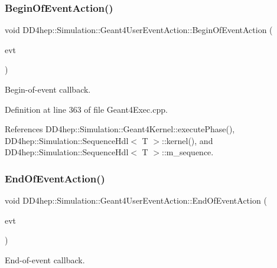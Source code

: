 \subsubsection{\texorpdfstring{Begin\+Of\+Event\+Action()}{BeginOfEventAction()}}
{\footnotesize\ttfamily void D\+D4hep\+::\+Simulation\+::\+Geant4\+User\+Event\+Action\+::\+Begin\+Of\+Event\+Action (\begin{DoxyParamCaption}\item[{const G4\+Event $\ast$}]{evt }\end{DoxyParamCaption})\hspace{0.3cm}{\ttfamily [virtual]}}



Begin-\/of-\/event callback. 



Definition at line 363 of file Geant4\+Exec.\+cpp.



References D\+D4hep\+::\+Simulation\+::\+Geant4\+Kernel\+::execute\+Phase(), D\+D4hep\+::\+Simulation\+::\+Sequence\+Hdl$<$ T $>$\+::kernel(), and D\+D4hep\+::\+Simulation\+::\+Sequence\+Hdl$<$ T $>$\+::m\+\_\+sequence.

\hypertarget{class_d_d4hep_1_1_simulation_1_1_geant4_user_event_action_a5fe13da05fc37d5d69ed814b061cada0}{}\label{class_d_d4hep_1_1_simulation_1_1_geant4_user_event_action_a5fe13da05fc37d5d69ed814b061cada0} 
\subsubsection{\texorpdfstring{End\+Of\+Event\+Action()}{EndOfEventAction()}}
{\footnotesize\ttfamily void D\+D4hep\+::\+Simulation\+::\+Geant4\+User\+Event\+Action\+::\+End\+Of\+Event\+Action (\begin{DoxyParamCaption}\item[{const G4\+Event $\ast$}]{evt }\end{DoxyParamCaption})\hspace{0.3cm}{\ttfamily [virtual]}}



End-\/of-\/event callback. 



